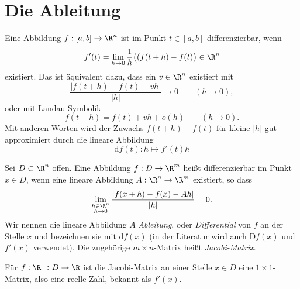 \documentclass{mycourse}
\begin{document}
\section{Die Ableitung}

Eine Abbildung $f:[a,b]\to\R^n$ ist im Punkt $t\in[a,b]$ differenzierbar, wenn
\[
f'(t)=\lim_{h\to 0}\frac 1h \big((f(t+h)-f(t)\big) \in \R^n
\]
existiert.
Das ist äquivalent dazu, dass ein $v\in\R^n$ existiert mit
\[
\frac{|f(t+h)-f(t)-vh|}{|h|}\to 0 \qquad (h\to 0),
\]
oder mit Landau-Symbolik
\[
f(t+h)=f(t)+vh+o(h) \qquad (h\to 0).
\]
Mit anderen Worten wird der Zuwachs $f(t+h)-f(t)$ für kleine $|h|$ gut approximiert durch die lineare Abbildung
\[
	\mathrm d f(t): h\mapsto f'(t)h
\]

\begin{df}
Sei $D\subset \R^n$ offen.
Eine Abbildung $f:D\to \R^m$ heißt differenzierbar im Punkt $x\in D$, wenn eine lineare Abbildung $A:\R^n\to\R^m$ existiert, so dass 
\[
\lim_{\substack{h\in \R^n \\ h\to 0}}\frac {|f(x+h)-f(x)-Ah|}{|h|}=0.
\]
Wir nennen die lineare Abbildung $A$ \emph{Ableitung}, oder \emph{Differential} von $f$ an der Stelle $x$ und bezeichnen sie mit $\mathrm d f(x)$ (in der Literatur wird auch $\mathrm D f(x)$ und $f'(x)$ verwendet).
Die zugehörige $m \times n$-Matrix heißt \emph{Jacobi-Matrix}.
\begin{note}
	Für $f: \R \supset D \to \R$ ist die Jacobi-Matrix an einer Stelle $x \in D$ eine $1\times 1$-Matrix, also eine reelle Zahl, bekannt als $f'(x)$.
\end{note}
\end{df}
\end{document}
